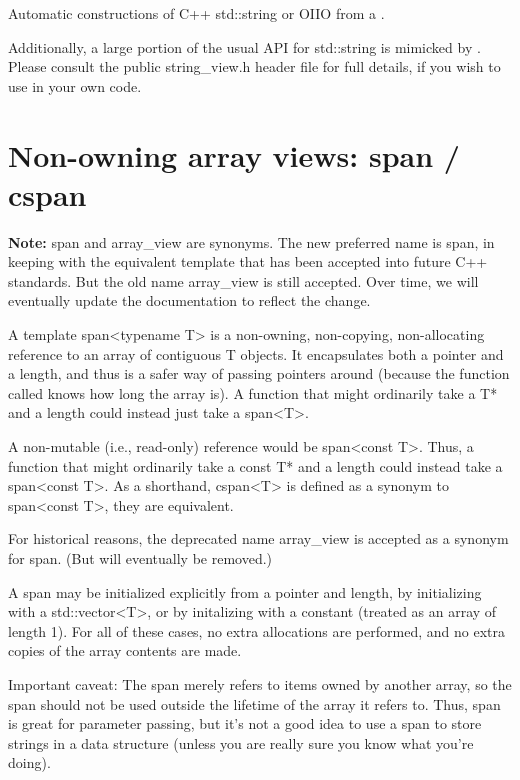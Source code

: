 Automatic constructions of C++ {\cf std::string} or OIIO \ustring from
a \stringview.
\apiend

\smallskip
\noindent Additionally, a large portion of the usual API for {\cf std::string}
is mimicked by \stringview.  Please consult the public {\cf string_view.h}
header file for full details, if you wish to use \stringview in your own
code.


\section{Non-owning array views: {\cf span} / {\cf cspan}}
\label{sec:span}
  

{\bf Note:} {\cf span} and {\cf array_view} are synonyms. The new preferred name is
{\cf span}, in keeping with the equivalent template that has been accepted into
future C++ standards. But the old name {\cf array_view} is still accepted. Over
time, we will eventually update the documentation to reflect the change.

A {\cf template span<typename T>} is a non-owning, non-copying,
non-allocating reference to an array of contiguous {\cf T} objects.  It
encapsulates both a pointer and a length, and thus is a safer way of passing
pointers around (because the function called knows how long the array is). A
function that might ordinarily take a {\cf T*} and a length could instead
just take a {\cf span<T>}.

A non-mutable (i.e., read-only) reference would be {\cf span<const T>}.
Thus, a function that might ordinarily take a {\cf const T*} and a length
could instead take a {\cf span<const T>}. As a shorthand, {\cf cspan<T>} is
defined as a synonym to {\cf span<const T>}, they are equivalent.

For historical reasons, the deprecated name {\cf array_view} is accepted as a
synonym for {\cf span}. (But will eventually be removed.)

A {\cf span} may be initialized explicitly from a pointer and length, by
initializing with a {\cf std::vector<T>}, or by initalizing with a constant
(treated as an array of length 1). For all of these cases, no extra
allocations are performed, and no extra copies of the array contents are
made.

Important caveat: The {\cf span} merely refers to items owned by another
array, so the {\cf span} should not be used outside the lifetime of the
array it refers to. Thus, {\cf span} is great for parameter passing, but
it's not a good idea to use a {\cf span} to store strings in a data
structure (unless you are really sure you know what you're doing).

